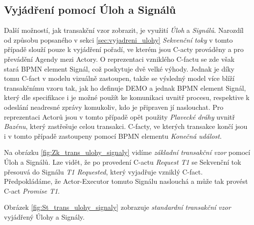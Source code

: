 \documentclass[]{article}
\begin{document}
\subsection{Vyjádření pomocí Úloh a Signálů} \label{sec:tr_vzor_ulohy_signaly}

Další možností, jak transakční vzor zobrazit, je využití \textit{Úloh} a \textit{Signálů}. Narozdíl od způsobu popsaného v sekci \ref{sec:vyjadreni_ulohy} \textit{Sekvenční toky} v tomto případě slouží pouze k vyjádření pořadí, ve kterém jsou C-acty prováděny a pro převádění Agendy mezi Actory. O reprezentaci vzniklého C-factu se zde však stará BPMN element Signál, což poskytuje dvě velké výhody. Jednak je díky tomu C-fact v modelu vizuálně zastoupen, takže se výsledný model více blíží transakčnímu vzoru tak, jak ho definuje DEMO a jednak BPMN element Signál, který dle specifikace \cite{Omg2011} i \cite{Silver2011} je možné použít ke komunikaci uvnitř procesu, respektive k odeslání neadresné zprávy komukoliv, kdo je připraven jí naslouchat. Pro reprezentaci Actorů jsou v tomto případě opět použity \textit{Plavecké dráhy} uvnitř \textit{Bazénu}, který zastřešuje celou transakci. C-facty, ve kterých transakce končí jsou i v tomto případě zastoupeny pomocí BPMN elementu \textit{Konečná událost}.

Na obrázku \ref{fig:Zk_trans_ulohy_signaly} vidíme \textit{základní transakční vzor} pomocí Úloh a Signálů. Lze vidět, že po provedení C-actu \textit{Request T1} se Sekvenční tok přesouvá do Signálu \textit{T1 Requested}, který vyjadřuje vzniklý C-fact. Předpokládáme, že Actor-Executor tomuto Signálu naslouchá a může tak provést C-act \textit{Promise T1}.

Obrázek \ref{fig:St_trans_ulohy_signaly} zobrazuje \textit{standardní transakční vzor} vyjádřený Úlohy a Signály.
\end{document}
